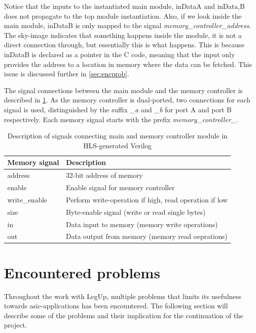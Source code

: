 Notice that the inputs to the instantiated main module, inDataA and inData,B does not propagate to the top module instantiation. Also, if we look inside the main module,  inDataB is only mapped to the signal \textit{memory\_controller\_address}. The sky-image indicates that something happens inside the module, it is not a direct connection through, but essentially this is what happens. This is because inDataB is declared as a pointer in the C code, meaning that the input only provides the address to a location in memory where the data can be fetched. This issue is discussed further in \cref{sec:encprob}.

The signal connections between the main module and the memory controller is described in \cref{tab:hlsoutputsignals}. As the memory controller is dual-ported, two connections for each signal is used, distinguished by the suffix \textit{\_a} and \textit{\_b} for port A and port B respectively. Each memory signal starts with the prefix \textit{memory\_controller\_}.

\begin{table}[hbpt]
    \centering
    \caption{\label{tab:hlsoutputsignals}Description of signals connecting main and memory controller module in HLS-generated Verilog}
    \begin{tabular}{ll}
      \textbf{Memory signal} & \textbf{Description}\\
      \toprule
      address & 32-bit address of memory \\
      \hline
      enable & Enable signal for memory controller \\
      \hline
      write\_enable & Perform write-operation if high, read operation if low\\
      \hline
      size & Byte-enable signal (write or read single bytes)\\
      \hline
      in & Data input to memory (memory write operations)\\
      \hline
      out & Data output from memory (memory read oeprations)\\
      \bottomrule
    \end{tabular}
\end{table}

\section{\label{sec:encprob}Encountered problems}
Throughout the work with LegUp, multiple problems that limits its usefulness towards \gls{asic}-applications has been encountered. The following section will describe some of the problems and their implication for the continuation of the project.
